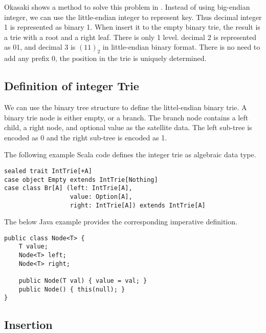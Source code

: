 \documentclass{article}
\begin{document}
Okasaki shows a method to solve this problem in \cite{okasaki-int-map}. Instead of
using big-endian integer, we can use the little-endian integer to represent key.
Thus decimal integer 1 is represented as binary 1. When insert it to the empty binary
trie, the result is a trie with a root and a right leaf.
There is only 1 level. decimal 2 is represented as 01, and decimal 3 is $(11)_2$
in little-endian binary format. There is no need to add
any prefix 0, the position in the trie is uniquely determined.

\subsection{Definition of integer Trie}
We can use the binary tree structure to define the littel-endian binary trie.
A binary trie node is either empty, or a branch. The branch
node contains a left child, a right node, and optional value as the
satellite data.
The left sub-tree is encoded as 0 and the right sub-tree
is encoded as 1.

The following example Scala code defines the integer trie as algebraic data type.

\lstset{language=Scala}
\begin{lstlisting}
sealed trait IntTrie[+A]
case object Empty extends IntTrie[Nothing]
case class Br[A] (left: IntTrie[A],
                  value: Option[A],
                  right: IntTrie[A]) extends IntTrie[A]
\end{lstlisting}

The below Java example provides the corresponding imperative definition.

\lstset{language=Java}
\begin{lstlisting}
public class Node<T> {
    T value;
    Node<T> left;
    Node<T> right;

    public Node(T val) { value = val; }
    public Node() { this(null); }
}
\end{lstlisting}


\subsection{Insertion}
\end{document}
